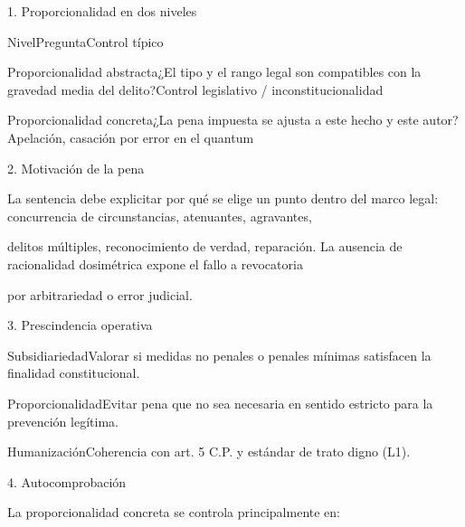 \documentclass[11pt,a4paper]{article}
\begin{document}
      1. Proporcionalidad en dos niveles\par



          NivelPreguntaControl típico\par




          Proporcionalidad abstracta¿El tipo y el rango legal son compatibles con la gravedad media del delito?Control legislativo / inconstitucionalidad\par

          Proporcionalidad concreta¿La pena impuesta se ajusta a este hecho y este autor?Apelación, casación por error en el quantum\par








      2. Motivación de la pena\par


        La sentencia debe explicitar por qué se elige un punto dentro del marco legal: concurrencia de circunstancias, atenuantes, agravantes,\par
        delitos múltiples, reconocimiento de verdad, reparación. La ausencia de racionalidad dosimétrica expone el fallo a revocatoria\par
        por arbitrariedad o error judicial.\par





      3. Prescindencia operativa\par


        SubsidiariedadValorar si medidas no penales o penales mínimas satisfacen la finalidad constitucional.\par

        ProporcionalidadEvitar pena que no sea necesaria en sentido estricto para la prevención legítima.\par

        HumanizaciónCoherencia con art. 5 C.P. y estándar de trato digno (L1).\par






      4. Autocomprobación\par

      La proporcionalidad concreta se controla principalmente en:\par
\end{document}

